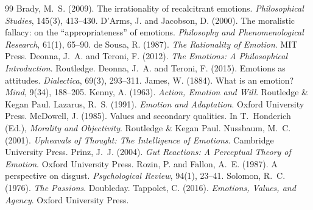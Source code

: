 \documentclass{situationist-preprint}
\begin{document}
\begin{thebibliography}{99}\small
{} Brady, M.~S. (2009). The irrationality of recalcitrant emotions. \emph{Philosophical Studies}, 145(3), 413--430.
 D'Arms, J. and Jacobson, D. (2000). The moralistic fallacy: on the \enquote{appropriateness} of emotions. \emph{Philosophy and Phenomenological Research}, 61(1), 65--90.
 de Sousa, R. (1987). \emph{The Rationality of Emotion}. MIT Press.
 Deonna, J.~A. and Teroni, F. (2012). \emph{The Emotions: A Philosophical Introduction}. Routledge.
 Deonna, J.~A. and Teroni, F. (2015). Emotions as attitudes. \emph{Dialectica}, 69(3), 293--311.
 James, W. (1884). What is an emotion? \emph{Mind}, 9(34), 188--205.
 Kenny, A. (1963). \emph{Action, Emotion and Will}. Routledge \& Kegan Paul.
 Lazarus, R.~S. (1991). \emph{Emotion and Adaptation}. Oxford University Press.
 McDowell, J. (1985). Values and secondary qualities. In T.~Honderich (Ed.), \emph{Morality and Objectivity}. Routledge \& Kegan Paul.
 Nussbaum, M.~C. (2001). \emph{Upheavals of Thought: The Intelligence of Emotions}. Cambridge University Press.
 Prinz, J.~J. (2004). \emph{Gut Reactions: A Perceptual Theory of Emotion}. Oxford University Press.
 Rozin, P. and Fallon, A.~E. (1987). A perspective on disgust. \emph{Psychological Review}, 94(1), 23--41.
 Solomon, R.~C. (1976). \emph{The Passions}. Doubleday.
 Tappolet, C. (2016). \emph{Emotions, Values, and Agency}. Oxford University Press.
\end{thebibliography}
\end{document}
